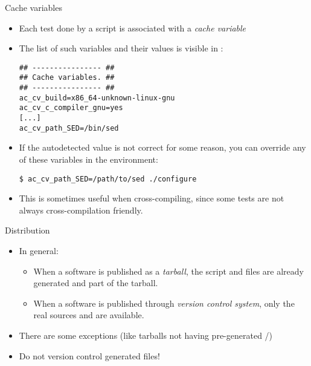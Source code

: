 \begin{frame}[fragile]{Cache variables}

  \begin{itemize}

  \item Each test done by a  script is associated
    with a {\em cache variable}

  \item The list of such variables and their values is visible in
    :
    \begin{block}{}
{\tiny
\begin{verbatim}
## ---------------- ##
## Cache variables. ##
## ---------------- ##
ac_cv_build=x86_64-unknown-linux-gnu
ac_cv_c_compiler_gnu=yes
[...]
ac_cv_path_SED=/bin/sed
\end{verbatim}}
    \end{block}

  \item If the autodetected value is not correct for some reason, you
    can override any of these variables in the environment:
    \begin{block}{}
{\scriptsize
\begin{verbatim}
$ ac_cv_path_SED=/path/to/sed ./configure
\end{verbatim}}
    \end{block}

  \item This is sometimes useful when cross-compiling, since some
    tests are not always cross-compilation friendly.

  \end{itemize}

\end{frame}

\begin{frame}{Distribution}
  \begin{itemize}
  \item In general:
    \begin{itemize}
    \item When a software is published as a {\em tarball}, the
       script and  files are already
      generated and part of the tarball.
    \item When a software is published through {\em version control
        system}, only the real sources  and
       are available.
    \end{itemize}
  \item There are some exceptions (like tarballs not having
    pre-generated /)
  \item Do not version control generated files!
  \end{itemize}
\end{frame}

